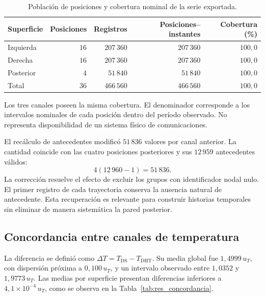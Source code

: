 \begin{table}[htbp]
\centering
\caption{Población de posiciones y cobertura nominal de la serie exportada.}
\label{tab:res_cobertura}
\small
\setlength{\tabcolsep}{5pt}
\begin{tabular}{lrrrr}
\toprule
Superficie & Posiciones & Registros & Posiciones--instantes & Cobertura (\%) \\
\midrule
Izquierda & $16$ & $207\,360$ & $207\,360$ & $100{,}0$ \\
Derecha & $16$ & $207\,360$ & $207\,360$ & $100{,}0$ \\
Posterior & $4$ & $51\,840$ & $51\,840$ & $100{,}0$ \\
Total & $36$ & $466\,560$ & $466\,560$ & $100{,}0$ \\
\bottomrule
\end{tabular}
\par\vspace{3pt}
\begin{minipage}{0.98\textwidth}\footnotesize
Los tres canales poseen la misma cobertura. El denominador corresponde a los intervalos nominales de cada posición dentro del período observado. No representa disponibilidad de un sistema físico de comunicaciones.
\end{minipage}
\end{table}




El recálculo de antecedentes modificó $51\,836$ valores por canal anterior. La cantidad coincide con las cuatro posiciones posteriores y sus $12\,959$ antecedentes válidos:
\begin{equation}
4(12\,960-1)=51\,836.
\label{eq:res_antecedentes_posterior}
\end{equation}
La corrección resuelve el efecto de excluir los grupos con identificador nodal nulo. El primer registro de cada trayectoria conserva la ausencia natural de antecedente. Esta recuperación es relevante para construir historias temporales sin eliminar de manera sistemática la pared posterior.

\subsection{Concordancia entre canales de temperatura}

La diferencia se definió como $\Delta T=T_{\mathrm{DS}}-T_{\mathrm{DHT}}$. Su media global fue $1{,}4999\,u_T$, con dispersión próxima a $0{,}100\,u_T$, y un intervalo observado entre $1{,}0352$ y $1{,}9773\,u_T$. Las medias por superficie presentan diferencias inferiores a $4{,}1\times10^{-4}\,u_T$, como se observa en la Tabla~\ref{tab:res_concordancia}.

